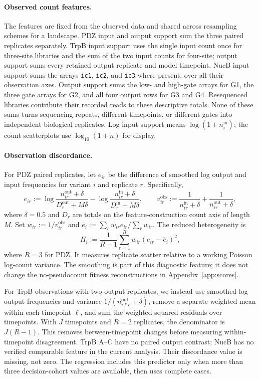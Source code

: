 \documentclass[11pt]{article}
\begin{document}
\paragraph{Observed count features.}
\label{app:count-features}
The features are fixed from the observed data and shared across resampling
schemes for a landscape. PDZ input and output support sum the three paired
replicates separately. TrpB input support uses the single input count once
for three-site libraries and the sum of the two input counts for four-site;
output support sums every retained output replicate and model timepoint.
NucB input support sums the arrays \texttt{ic1}, \texttt{ic2}, and
\texttt{ic3} where present, over all their observation axes. Output support
sums the low- and high-gate arrays for G1, the three gate arrays for G2,
and all four output rows for G3 and G4. Resequenced libraries contribute
their recorded reads to these descriptive totals. None of these sums turns
sequencing repeats, different timepoints, or different gates into independent
biological replicates. Log input support means $\log(1+n_i^{\mathrm{in}})$;
the count scatterplots use $\log_{10}(1+n)$ for display.

\paragraph{Observation discordance.}
For PDZ paired replicates, let $e_{ir}$ be the difference of smoothed log
output and input frequencies for variant $i$ and replicate $r$. Specifically,
\[
e_{ir}:=\log\frac{n_{ir}^{\mathrm{out}}+\delta}
{D_r^{\mathrm{out}}+M\delta}
-\log\frac{n_{ir}^{\mathrm{in}}+\delta}{D_r^{\mathrm{in}}+M\delta},
\qquad
v_{ir}^{\mathrm{obs}}:=\frac{1}{n_{ir}^{\mathrm{in}}+\delta}
+\frac{1}{n_{ir}^{\mathrm{out}}+\delta},
\]
where $\delta=0.5$ and $D_r$ are totals on the feature-construction count
axis of length $M$. Set $w_{ir}:=1/v_{ir}^{\mathrm{obs}}$ and
$\overline e_i:=\sum_rw_{ir}e_{ir}/\sum_rw_{ir}$. The reduced
heterogeneity is
\[
H_i:=\frac{1}{R-1}\sum_{r=1}^R w_{ir}(e_{ir}-\overline e_i)^2,
\]
where $R=3$ for PDZ. It measures replicate scatter relative to a working
Poisson log-count variance. The smoothing is part of this diagnostic feature;
it does not change the no-pseudocount fitness reconstructions in
Appendix~\ref{app:scores}.

For TrpB observations with two output replicates, we instead use smoothed log
output frequencies and variance $1/(n_{i\ell r}^{\mathrm{out}}+\delta)$,
remove a separate weighted mean within each timepoint $\ell$, and sum the
weighted squared residuals over timepoints. With $J$ timepoints and $R=2$
replicates, the denominator is $J(R-1)$. This removes between-timepoint
changes before measuring within-timepoint disagreement. TrpB A--C have no
paired output contrast; NucB has no verified comparable feature in the
current analysis. Their discordance value is missing, not zero. The regression
includes this predictor only when more than three decision-cohort values
are available, then uses complete cases.
\end{document}

